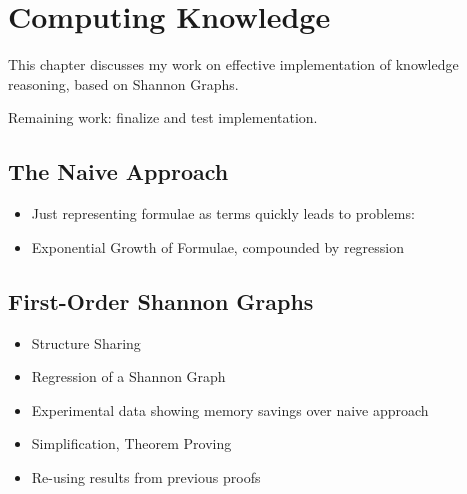 \chapter{Computing Knowledge}\label{ch:implementation}

This chapter discusses my work on effective implementation of knowledge
reasoning, based on Shannon Graphs.

Remaining work: finalize and test implementation.

\section{The Naive Approach}

\begin{itemize}
\item Just representing formulae as terms quickly leads to problems:
\item Exponential Growth of Formulae, compounded by regression
\end{itemize}

\section{First-Order Shannon Graphs}

\begin{itemize}
\item Structure Sharing
\item Regression of a Shannon Graph
\item Experimental data showing memory savings over naive approach
\item Simplification, Theorem Proving
\item Re-using results from previous proofs
\end{itemize}

